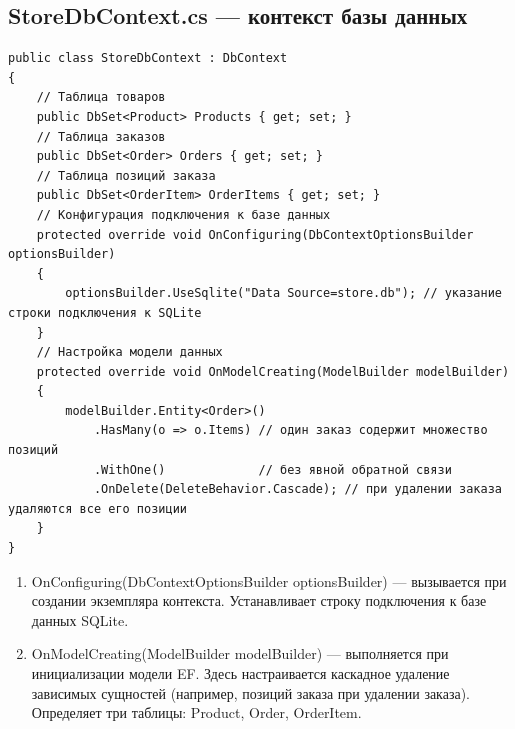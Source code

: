 \documentclass[12pt]{article}
\renewcommand{\texttt}[1]{{\small\ttfamily #1}}
\newenvironment{code}{\captionsetup{type=listing}}{}
\numberwithin{listing}{section}
\numberwithin{figure}{section}
\begin{document}
\subsection{\texttt{StoreDbContext.cs} — контекст базы данных}
\begin{code}
	\begin{verbatim}
public class StoreDbContext : DbContext
{
    // Таблица товаров
    public DbSet<Product> Products { get; set; }
    // Таблица заказов
    public DbSet<Order> Orders { get; set; }
    // Таблица позиций заказа
    public DbSet<OrderItem> OrderItems { get; set; }
    // Конфигурация подключения к базе данных
    protected override void OnConfiguring(DbContextOptionsBuilder optionsBuilder)
    {
        optionsBuilder.UseSqlite("Data Source=store.db"); // указание строки подключения к SQLite
    }
    // Настройка модели данных
    protected override void OnModelCreating(ModelBuilder modelBuilder)
    {
        modelBuilder.Entity<Order>()
            .HasMany(o => o.Items) // один заказ содержит множество позиций
            .WithOne()             // без явной обратной связи
            .OnDelete(DeleteBehavior.Cascade); // при удалении заказа удаляются все его позиции
    }
}
    \end{verbatim}
	\label{lst:StoreDbContext}
\end{code}

\begin{enumerate}
	\item \texttt{OnConfiguring(DbContextOptionsBuilder optionsBuilder)} — вызывается при создании экземпляра контекста. Устанавливает строку подключения к базе данных SQLite.
	\item \texttt{OnModelCreating(ModelBuilder modelBuilder)} — выполняется при инициализации модели EF. Здесь настраивается каскадное удаление зависимых сущностей (например, позиций заказа при удалении заказа). Определяет три таблицы: \texttt{Product}, \texttt{Order}, \texttt{OrderItem}.
\end{enumerate}
\end{document}
